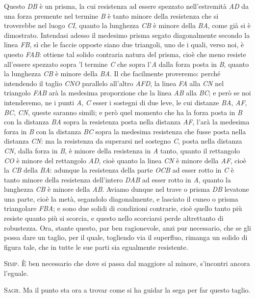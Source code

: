 \documentclass[11pt,twoside,openany]{book}
\newcommand{\speaker}[1]{\textcolor{rubric}{\textsc{#1}}\space}
\begin{document}
Questo \emph{DB} è un prisma, la cui resistenza ad essere spezzato nell'estremità \emph{AD} da una forza premente nel termine \emph{B} è tanto minore della resistenza che si troverebbe nel luogo \emph{CI}, quanto la lunghezza \emph{CB} è minore della \emph{BA}, come già si è dimostrato. Intendasi adesso il medesimo prisma segato diagonalmente secondo la linea \emph{FB}, sì che le faccie opposte siano due triangoli, uno de i quali, verso noi, è questo \emph{FAB}: ottiene tal solido contraria natura del prisma, cioè che meno resiste all'essere spezzato sopra 'l termine \emph{C} che sopra l'\emph{A} dalla forza posta in \emph{B}, quanto la lunghezza \emph{CB} è minore della \emph{BA}. Il che facilmente proveremo: perché intendendo il taglio \emph{CNO} parallelo all'altro \emph{AFD}, la linea \emph{FA} alla \emph{CN} nel triangolo \emph{FAB} arà la medesima proporzione che la linea \emph{AB} alla \emph{BC}; e però se noi intenderemo, ne i punti \emph{A}, \emph{C} esser i sostegni di due leve, le cui distanze \emph{BA}, \emph{AF}, \emph{BC}, \emph{CN}, queste saranno simili; e però quel momento che ha la forza posta in \emph{B} con la distanza \emph{BA} sopra la resistenza posta nella distanza \emph{AF}, l'arà la medesima forza in \emph{B} con la distanza \emph{BC} sopra la medesima resistenza che fusse posta nella distanza \emph{CN}: ma la resistenza da superarsi nel sostegno \emph{C}, posta nella distanza \emph{CN}, dalla forza in \emph{B}, è minore della resistenza in \emph{A} tanto, quanto il rettangolo \emph{CO} è minore del rettangolo \emph{AD}, cioè quanto la linea \emph{CN} è minore della \emph{AF}, cioè la \emph{CB} della \emph{BA}: adunque la resistenza della parte \emph{OCB} ad esser rotto in \emph{C} è tanto minore della resistenza dell'intero \emph{DAB} ad esser rotto in \emph{A}, quanto la lunghezza \emph{CB} è minore della \emph{AB}. Aviamo dunque nel trave o prisma \emph{DB} levatone una parte, cioè la metà, segandolo diagonalmente, e lasciato il cuneo o prisma triangolare \emph{FBA}; e sono due solidi di condizioni contrarie, cioè quello tanto più resiste quanto più si scorcia, e questo nello scorciarsi perde altrettanto di robustezza. Ora, stante questo, par ben ragionevole, anzi pur necessario, che se gli possa dare un taglio, per il quale, togliendo via il superfluo, rimanga un solido di figura tale, che in tutte le sue parti sia egualmente resistente.

\speaker{Simp.} È ben necessario che dove si passa dal maggiore al minore, s'incontri ancora l'eguale.

\speaker{Sagr.} Ma il punto sta ora a trovar come si ha guidar la sega per far questo taglio.
\end{document}
